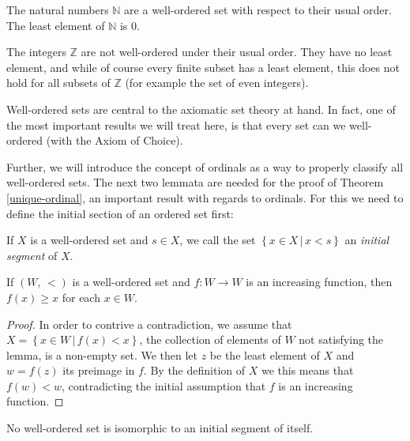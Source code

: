 \documentclass[../../main.tex]{subfiles}
\begin{document}
\begin{example}
    The natural numbers $\mathbb{N}$ are a well-ordered set with respect to their usual order.
    The least element of $\mathbb{N}$ is $0$.
\end{example}

\begin{example}
    The integers $\mathbb{Z}$ are not well-ordered under their usual order.
    They have no least element, and while of course every finite subset has a least element, 
    this does not hold for all subsets of $\mathbb{Z}$ (for example the set of even integers).
\end{example}

Well-ordered sets are central to the axiomatic set theory at hand.
In fact, one of the most important results we will treat here, is that every set can we well-ordered (with the Axiom of Choice).

Further, we will introduce the concept of ordinals as a way to properly classify all well-ordered sets.
The next two lemmata are needed for the proof of Theorem \ref{unique-ordinal}, an important result with regards to ordinals.
For this we need to define the initial section of an ordered set first:

\begin{definition}
    If $X$ is a well-ordered set and $s \in X$, we call the set $\left\{x \in X \,\vert\, x < s\right\}$ an \textit{initial segment} of $X$.
\end{definition}

\begin{lemma}\label{increasing-fcn-lemm}\cite[Lemma 2.1, p.13]{Jec78}
    If $\left(W,\, <\right)$ is a well-ordered set and $f: W \to W$ is an increasing function, then $f(x) \geq x$ for each $x\in W$.
\end{lemma}

\begin{proof}
    In order to contrive a contradiction, we assume that $X = \left\{x \in W \,\vert\, f(x) < x\right\}$, the collection of elements of $W$ not satisfying the lemma, is a non-empty set.
    We then let $z$ be the least element of $X$ and $w = f(z)$ its preimage in $f$.
    By the definition of $X$ we this means that $f(w) < w$, contradicting the initial assumption that $f$ is an increasing function.
\end{proof}

\begin{lemma}\cite[Lemma 2.2, p.13]{Jec78}\label{initial-segment-isomorphism}
    No well-ordered set is isomorphic to an initial segment of itself.
\end{lemma}
\end{document}
